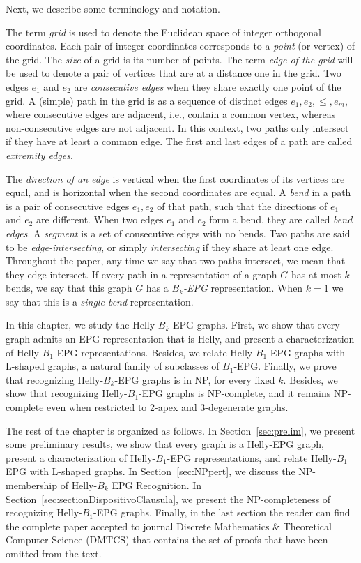 


Next, we describe some terminology and notation.

The term \emph{grid} is used to denote the Euclidean space of integer orthogonal coordinates. Each pair of integer coordinates corresponds to a \emph{point} (or vertex) of the grid. The \emph{size} of a grid is its number of points. The term \emph{edge of the grid} will be used to denote a pair of vertices that are at a distance one in the grid. Two edges $e_1$ and $e_2$ are \emph{consecutive edges} when they share exactly one point of the grid.
 A (simple) path in the grid is as a sequence of distinct edges $e_1, e_2, \leq, e_m$,  where consecutive edges are adjacent, i.e., contain a common vertex, whereas non-consecutive edges are not adjacent.  In this context, two paths only intersect if they have at least a common edge. The first and last edges of a path are called \emph{extremity edges}.
  
The \emph{direction of an edge} is vertical when the first coordinates of its vertices are equal, and is horizontal when the second coordinates are equal. A \emph {bend} in a path is a pair of consecutive edges $ e_1, e_2 $ of that path, such that the directions of $ e_1$ and $ e_2$ are different. When two edges $ e_1$ and $e_2 $ form a bend, they are called \emph { bend edges}. A \emph {segment} is a set of consecutive edges with no bends. %
Two paths are said to be \emph{edge-intersecting}, or simply  \emph{intersecting} if they share at least one edge. Throughout the paper, any time we say that two paths intersect, we mean that they edge-intersect. If every path in a representation of a graph $G$ has at most $k$ bends, we say that this graph $G$ has a \emph{$B_k$-EPG} representation. When $k = 1$ we say that this is a \emph{single bend} representation.

\medskip

In this chapter, we study the Helly-$B_k$-EPG graphs. First, we show that every graph admits an EPG representation that is Helly, and present a characterization of Helly-$B_1$-EPG representations. Besides, we relate Helly-$B_1$-EPG graphs with L-shaped graphs, a natural family of subclasses of $B_1$-EPG. Finally, we prove that recognizing Helly-$B_k$-EPG graphs is in NP, for every fixed $k$. Besides, we show that recognizing Helly-$B_1$-EPG graphs is NP-complete, and it remains NP-complete even when restricted to 2-apex and 3-degenerate graphs.

The rest of the chapter is organized as follows. In Section~\ref{sec:prelim}, we present some preliminary results, we show that every graph is a Helly-EPG graph, present a characterization of Helly-$B_1$-EPG representations, and relate Helly-$B_1$ EPG with L-shaped graphs. In Section~\ref{sec:NPpert}, we discuss the NP-membership of {\sc Helly-$B_k$ EPG Recognition}. In Section~\ref{sec:sectionDispositivoClausula}, we present the NP-completeness of recognizing Helly-$B_1$-EPG graphs. Finally, in the last section the reader can find the complete paper accepted to  journal Discrete Mathematics \& Theoretical Computer Science (DMTCS) that contains the set of proofs that have been omitted from the text.


